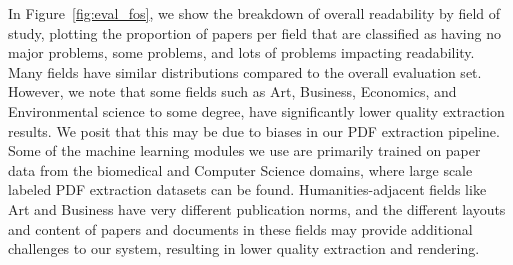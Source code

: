 In Figure~\ref{fig:eval_fos}, we show the breakdown of overall readability by field of study,
plotting the proportion of papers per field that are classified as having no major problems, some problems, and lots of problems impacting readability. Many fields have similar distributions compared to the overall evaluation set. However, we note that some fields such as Art, Business, Economics, and Environmental science to some degree, have significantly lower quality extraction results. We posit that this may be due to biases in our PDF extraction pipeline. Some of the machine learning modules we use are primarily trained on paper data from the biomedical and Computer Science domains, where large scale labeled PDF extraction datasets can be found. Humanities-adjacent fields like Art and Business have very different publication norms, and the different layouts and content of papers and documents in these fields may provide additional challenges to our system, resulting in lower quality extraction and rendering. 

